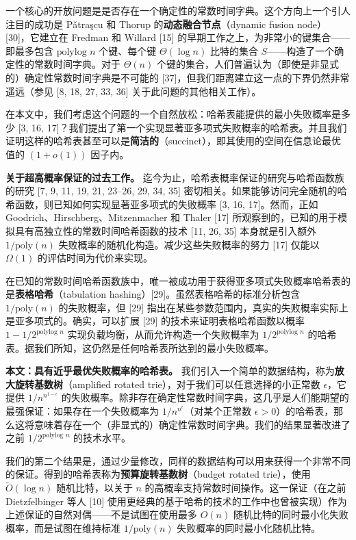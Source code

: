 \documentclass[12pt,a4paper]{ctexart}
\theoremstyle{remark}
\begin{document}
一个核心的开放问题是是否存在一个确定性的常数时间字典。这个方向上一个引人注目的成功是 Pǎtraşcu 和 Thorup 的\textbf{动态融合节点}（dynamic fusion node）[30]，它建立在 Fredman 和 Willard [15] 的早期工作之上，为非常小的键集合——即最多包含 $\text{polylog } n$ 个键、每个键 $\Theta(\log n)$ 比特的集合 $S$——构造了一个确定性的常数时间字典。对于 $\Theta(n)$ 个键的集合，人们普遍认为（即使是非显式的）确定性常数时间字典是不可能的 [37]，但我们距离建立这一点的下界仍然非常遥远（参见 [8, 18, 27, 33, 36] 关于此问题的其他相关工作）。

在本文中，我们考虑这个问题的一个自然放松：哈希表能提供的最小失败概率是多少 [3, 16, 17]？我们提出了第一个实现显著亚多项式失败概率的哈希表。并且我们证明这样的哈希表甚至可以是\textbf{简洁的}（succinct），即其使用的空间在信息论最优值的 $(1+o(1))$ 因子内。

\textbf{关于超高概率保证的过去工作。} 迄今为止，哈希表概率保证的研究与哈希函数族的研究 [7, 9, 11, 19, 21, 23–26, 29, 34, 35] 密切相关。如果能够访问完全随机的哈希函数，则已知如何实现显著亚多项式的失败概率 [3, 16, 17]。然而，正如 Goodrich、Hirschberg、Mitzenmacher 和 Thaler [17] 所观察到的，已知的用于模拟具有高独立性的常数时间哈希函数的技术 [11, 26, 35] 本身就是引入额外 $1/\text{poly}(n)$ 失败概率的随机化构造。减少这些失败概率的努力 [17] 仅能以 $\Omega(1)$ 的评估时间为代价来实现。

在已知的常数时间哈希函数族中，唯一被成功用于获得亚多项式失败概率哈希表的是\textbf{表格哈希}（tabulation hashing）[29]。虽然表格哈希的标准分析包含 $1/\text{poly}(n)$ 的失败概率，但 [29] 指出在某些参数范围内，真实的失败概率实际上是亚多项式的。确实，可以扩展 [29] 的技术来证明表格哈希函数以概率 $1-1/2^{\text{polylog } n}$ 实现负载均衡，从而允许构造一个失败概率为 $1/2^{\text{polylog } n}$ 的哈希表。据我们所知，这仍然是任何哈希表所达到的最小失败概率。

\textbf{本文：具有近乎最优失败概率的哈希表。} 我们引入一个简单的数据结构，称为\textbf{放大旋转基数树}（amplified rotated trie），对于我们可以任意选择的小正常数 $\epsilon$，它提供 $1/n^{n^{1-\epsilon}}$ 的失败概率。除非存在确定性常数时间字典，这几乎是人们能期望的最强保证：如果存在一个失败概率为 $1/n^{n^{\epsilon}}$（对某个正常数 $\epsilon > 0$）的哈希表，那么这将意味着存在一个（非显式的）确定性常数时间字典。我们的结果显著改进了之前 $1/2^{\text{polylog } n}$ 的技术水平。

我们的第二个结果是，通过少量修改，同样的数据结构可以用来获得一个非常不同的保证。得到的哈希表称为\textbf{预算旋转基数树}（budget rotated trie），使用 $\tilde{O}(\log n)$ 随机比特，以关于 $n$ 的高概率支持常数时间操作。这一保证（在之前 Dietzfelbinger 等人 [10] 使用更经典的基于哈希的技术的工作中也曾被实现）作为上述保证的自然对偶——不是试图在使用最多 $O(n)$ 随机比特的同时最小化失败概率，而是试图在维持标准 $1/\text{poly}(n)$ 失败概率的同时最小化随机比特。
\end{document}
